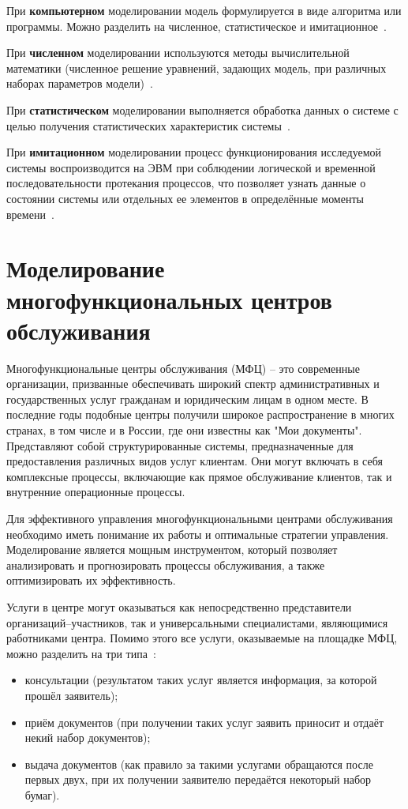 При \textbf{компьютерном} моделировании модель формулируется в виде алгоритма или программы. Можно разделить на численное, статистическое и имитационное~\cite{m_types}.

При \textbf{численном} моделировании используются методы вычислительной математики (численное решение уравнений, задающих модель, при различных наборах параметров модели)~\cite{m_types}.

При \textbf{статистическом} моделировании выполняется обработка данных о системе с целью получения статистических характеристик системы~\cite{m_types}.

При \textbf{имитационном} моделировании процесс функционирования исследуемой системы воспроизводится на ЭВМ при соблюдении логической и временной последовательности протекания процессов, что позволяет узнать данные о состоянии системы или отдельных ее элементов в определённые моменты времени~\cite{m_types}.

\section{Моделирование многофункциональных центров обслуживания}

Многофункциональные центры обслуживания (МФЦ) – это современные организации, призванные обеспечивать широкий спектр административных и государственных услуг гражданам и юридическим лицам в одном месте. В последние годы подобные центры получили широкое распространение в многих странах, в том числе и в России, где они известны как "Мои документы". Представляют собой структурированные системы, предназначенные для предоставления различных видов услуг клиентам. Они могут включать в себя комплексные процессы, включающие как прямое обслуживание клиентов, так и внутренние операционные процессы.

Для эффективного управления многофункциональными центрами обслуживания необходимо иметь понимание их работы и оптимальные стратегии управления. Моделирование является мощным инструментом, который позволяет анализировать и прогнозировать процессы обслуживания, а также оптимизировать их эффективность.

Услуги в центре могут оказываться как непосредственно представители организаций--участников, так и универсальными специалистами, являющимися работниками центра. Помимо этого все услуги, оказываемые на площадке МФЦ, можно разделить на три типа~\cite{serv_types}:
\begin{itemize}[label=---]
	\item консультации (результатом таких услуг является информация, за которой прошёл заявитель);
	\item приём документов (при получении таких услуг заявить приносит и отдаёт некий набор документов);
	\item выдача документов (как правило за такими услугами обращаются после первых двух, при их получении заявителю передаётся некоторый набор бумаг).
\end{itemize}

